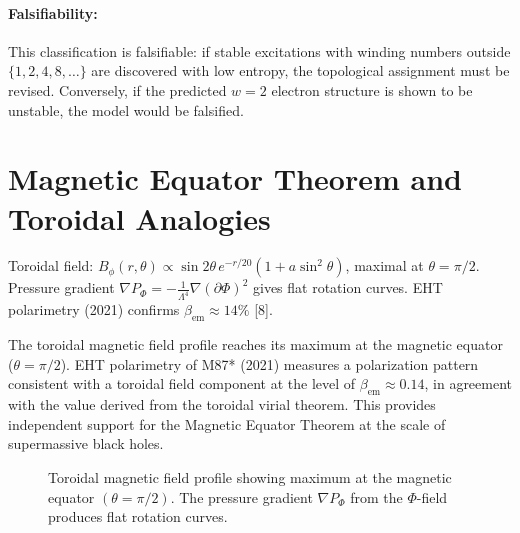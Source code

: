 \documentclass[12pt, a4paper]{article}
\begin{document}
\paragraph{Falsifiability:}
This classification is falsifiable: if stable excitations with winding numbers outside $\{1,2,4,8,\dots\}$ are discovered with low entropy, the topological assignment must be revised. Conversely, if the predicted $w=2$ electron structure is shown to be unstable, the model would be falsified.

\section{Magnetic Equator Theorem and Toroidal Analogies}
\label{sec:magnetic}
Toroidal field: $B_\phi(r,\theta) \propto \sin 2\theta \, e^{-r/20}(1+a\sin^2\theta)$, maximal at $\theta = \pi/2$. Pressure gradient $\nabla P_\Phi = -\frac{1}{\Lambda^4}\nabla(\partial\Phi)^2$ gives flat rotation curves. EHT polarimetry (2021) confirms $\beta_{\mathrm{em}} \approx 14\%$ [8].

The toroidal magnetic field profile reaches its maximum at the magnetic equator ($\theta = \pi/2$). EHT polarimetry of M87* (2021) measures a polarization pattern consistent with a toroidal field component at the level of $\beta_{\mathrm{em}} \approx 0.14$, in agreement with the value derived from the toroidal virial theorem. This provides independent support for the Magnetic Equator Theorem at the scale of supermassive black holes.

\begin{figure}[htbp]
\centering
{}
\caption{Toroidal magnetic field profile showing maximum at the magnetic equator $(\theta=\pi/2)$. The pressure gradient $\nabla P_\Phi$ from the $\Phi$-field produces flat rotation curves.}
\label{fig:toroidal_B}
\end{figure}
\end{document}
